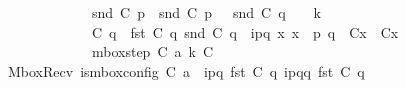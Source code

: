\begin{isabellebody}
\ \ \ \ \ \ \ \ \ \ \ \ snd\ {\isacharparenleft}{\kern0pt}C{}\ p{\isacharparenright}{\kern0pt}\ {\isacharequal}{\kern0pt}\ snd\ {\isacharparenleft}{\kern0pt}C{}\ p{\isacharparenright}{\kern0pt}{\isacharsemicolon}{\kern0pt}\ {\isacharparenleft}{\kern0pt}\ {\isacharbar}{\kern0pt}\ {\isacharparenleft}{\kern0pt}snd\ {\isacharparenleft}{\kern0pt}C{}\ q{\isacharparenright}{\kern0pt}{\isacharparenright}{\kern0pt}\ {\isacharbar}{\kern0pt}\ {\isacharparenright}{\kern0pt}\ {\isacharless}{\kern0pt}\isactrlsub {\isasymB}\ k{\isacharsemicolon}{\kern0pt}\isanewline
\ \ \ \ \ \ \ \ \ \ \ \ C{}\ q\ {\isacharequal}{\kern0pt}\ {\isacharparenleft}{\kern0pt}fst\ {\isacharparenleft}{\kern0pt}C{}\ q{\isacharparenright}{\kern0pt}{\isacharcomma}{\kern0pt}\ {\isacharparenleft}{\kern0pt}snd\ {\isacharparenleft}{\kern0pt}C{}\ q{\isacharparenright}{\kern0pt}{\isacharparenright}{\kern0pt}\ {\isasymcdot}\ {\isacharbrackleft}{\kern0pt}{\isacharparenleft}{\kern0pt}i\isactrlbsup p{\isasymrightarrow}q\isactrlesup {\isacharparenright}{\kern0pt}{\isacharbrackright}{\kern0pt}{\isacharparenright}{\kern0pt}{\isacharsemicolon}{\kern0pt}\ {\isasymforall}x{\isachardot}{\kern0pt}\ x\ {\isasymnotin}\ {\isacharbraceleft}{\kern0pt}p{\isacharcomma}{\kern0pt}\ q{\isacharbraceright}{\kern0pt}\ {\isasymlongrightarrow}\ C{}{\isacharparenleft}{\kern0pt}x{\isacharparenright}{\kern0pt}\ {\isacharequal}{\kern0pt}\ C{}{\isacharparenleft}{\kern0pt}x{\isacharparenright}{\kern0pt}{\isasymrbrakk}\ {\isasymLongrightarrow}\isanewline
\ \ \ \ \ \ \ \ \ \ \ \ mbox{\isacharunderscore}{\kern0pt}step\ C{}\ a\ k\ C{}{\isachardoublequoteclose}\ {\isacharbar}{\kern0pt}\isanewline
MboxRecv{\isacharcolon}{\kern0pt}\ {\isachardoublequoteopen}{\isasymlbrakk}is{\isacharunderscore}{\kern0pt}mbox{\isacharunderscore}{\kern0pt}config\ C{}{\isacharsemicolon}{\kern0pt}\ a\ {\isacharequal}{\kern0pt}\ {\isacharquery}{\kern0pt}{\isasymlangle}{\isacharparenleft}{\kern0pt}i\isactrlbsup p{\isasymrightarrow}q\isactrlesup {\isacharparenright}{\kern0pt}{\isasymrangle}{\isacharsemicolon}{\kern0pt}\ fst\ {\isacharparenleft}{\kern0pt}C{}\ q{\isacharparenright}{\kern0pt}\ {\isasymmidarrow}{\isacharquery}{\kern0pt}{\isasymlangle}{\isacharparenleft}{\kern0pt}i\isactrlbsup p{\isasymrightarrow}q\isactrlesup {\isacharparenright}{\kern0pt}{\isasymrangle}{\isasymrightarrow}q\ {\isacharparenleft}{\kern0pt}fst\ {\isacharparenleft}{\kern0pt}C{}\ q{\isacharparenright}{\kern0pt}{\isacharparenright}{\kern0pt}{\isacharsemicolon}{\kern0pt}\isanewline

\end{isabellebody}
